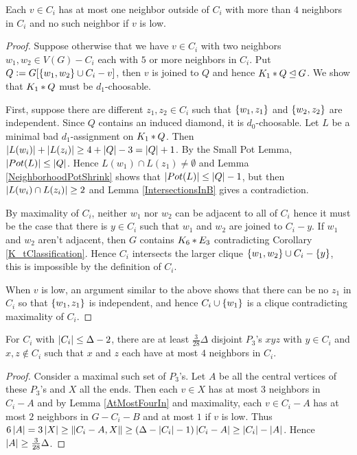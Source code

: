 \begin{lem}\label{AtMostFourIn}
Each $v \in C_i$ has at most one
neighbor outside of $C_i$ with more than $4$ neighbors in $C_i$ and no such
neighbor if $v$ is low.
\end{lem}
\begin{proof}
Suppose otherwise that we have $v \in C_i$ with two neighbors $w_1, w_2 \in V(G)
- C_i$ each with $5$ or more neighbors in $C_i$.  Put $Q \mathrel{\mathop:}=
G[\left\{ w_1,w_2 \right\} \cup C_i - v]$, then $v$ is joined to $Q$ and hence
$K_1 \mbox{\hspace{2 pt}$\ast$\hspace{2 pt}} Q \unlhd G$.  We show that $K_1 \mbox{\hspace{2 pt}$\ast$\hspace{2 pt}} Q$ must be $d_1$-choosable. 

First, suppose there are different $z_1,z_2 \in C_i$ such that $\left\{ w_1, z_1 \right\}$
and $\left\{ w_2, z_2 \right\}$ are independent.  Since $Q$ contains an induced diamond,
it is $d_0$-choosable. Let $L$ be a minimal bad $d_1$-assignment on
$K_1 \mbox{\hspace{2 pt}$\ast$\hspace{2 pt}} Q$. Then $\left|L(w_i)\right| + \left|L(z_i)\right| \geq 4 + \left|Q\right| - 3 = \left|Q\right| + 1$.  By the Small Pot Lemma, $\left|Pot(L)\right| \leq \left|Q\right|$.  Hence
$L(w_1) \cap L(z_1) \neq \emptyset$ and Lemma \ref{NeighborhoodPotShrink} shows
that $\left|Pot(L)\right| \leq \left|Q\right| - 1$, but then $\left|L(w_i) \cap L(z_i)\right|
\geq 2$ and Lemma \ref{IntersectionsInB} gives a contradiction.

By maximality of $C_i$, neither $w_1$ nor $w_2$ can be adjacent to all of $C_i$
hence it must be the case that there is $y \in C_i$ such that $w_1$ and $w_2$
are joined to $C_i - y$.  If $w_1$ and $w_2$ aren't adjacent, then $G$ contains $K_6 \mbox{\hspace{2 pt}$\ast$\hspace{2 pt}} E_3$ contradicting Corollary \ref{K_tClassification}.  Hence $C_i$ intersects the larger clique $\left\{ w_1, w_2 \right\} \cup C_i - \left\{ y \right\}$, this is impossible by the definition of $C_i$.

When $v$ is low, an argument similar to the above shows that there can be no
$z_1$ in $C_i$ so that $\left\{ w_1, z_1 \right\}$ is independent, and hence $C_i \cup
\left\{ w_1 \right\}$ is a clique contradicting maximality of $C_i$.
\end{proof}

\begin{lem}\label{triples}
For $C_i$ with $\left|C_i\right| \leq \Delta - 2$, there are
at least $\frac{3}{28}\Delta$ disjoint $P_3$'s $xyz$ with $y \in C_i$ and $x, z
\not \in C_i$ such that $x$ and $z$ each have at most $4$ neighbors in $C_i$.
\end{lem}
\begin{proof}
Consider a maximal such set of $P_3$'s. Let $A$ be all the central vertices of
these $P_3$'s and $X$ all the ends.  Then each $v \in X$ has at most $3$
neighbors in $C_i - A$ and by Lemma \ref{AtMostFourIn} and maximality, each $v
\in C_i - A$ has at most $2$ neighbors in $G-C_i-B$ and at most $1$ if $v$ is
low. Thus $6\left|A\right| = 3\left|X\right| \geq \left\Vert C_i-A, X\right\Vert \geq (\Delta - \left|C_i\right|
- 1)\left|C_i-A\right| \geq \left|C_i\right| - \left|A\right|$.  Hence $\left|A\right| \geq
\frac{3}{28}\Delta$.
\end{proof}

